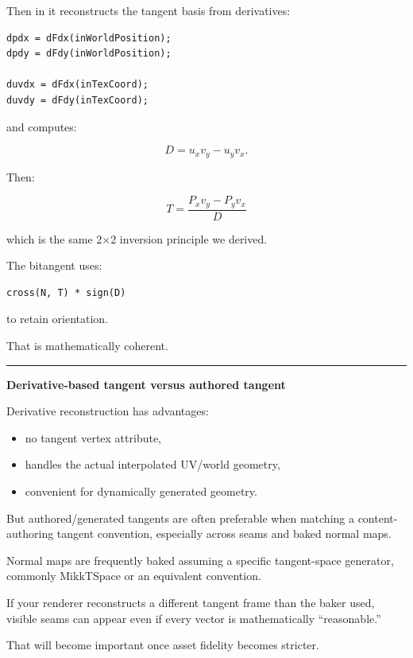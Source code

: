 Then in  it reconstructs the tangent basis from derivatives:

\begin{verbatim}
dpdx = dFdx(inWorldPosition);
dpdy = dFdy(inWorldPosition);

duvdx = dFdx(inTexCoord);
duvdy = dFdy(inTexCoord);
\end{verbatim}

and computes:

\[
D=
u_xv_y-u_yv_x.
\]

Then:

\[
\boxed{
T=
\frac{
P_xv_y-P_yv_x
}{D}
}
\]

which is the same 2×2 inversion principle we derived.

The bitangent uses:

\begin{verbatim}
cross(N, T) * sign(D)
\end{verbatim}

to retain orientation.

That is mathematically coherent.

\begin{center}\rule{0.5\linewidth}{0.5pt}\end{center}

\textbf{Derivative-based tangent versus authored tangent}

Derivative reconstruction has advantages:

\begin{itemize}
\tightlist
\item
  no tangent vertex attribute,
\item
  handles the actual interpolated UV/world geometry,
\item
  convenient for dynamically generated geometry.
\end{itemize}

But authored/generated tangents are often preferable when matching a content-authoring tangent convention, especially across seams and baked normal maps.

Normal maps are frequently baked assuming a specific tangent-space generator, commonly MikkTSpace or an equivalent convention.

If your renderer reconstructs a different tangent frame than the baker used, visible seams can appear even if every vector is mathematically ``reasonable.''

That will become important once asset fidelity becomes stricter.

